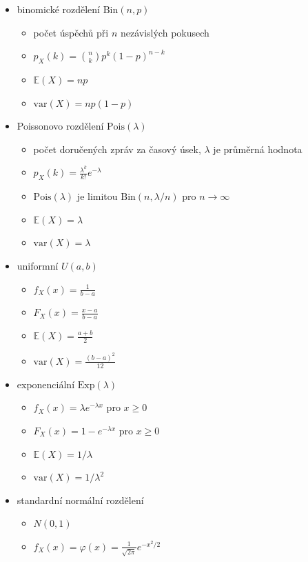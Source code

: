 \begin{itemize}
\begin{itemize}
\begin{itemize}
\item $\text{var}(X)=\frac{1-p}{p^2}$
\end{itemize}
\item binomické rozdělení $\text{Bin}(n,p)$
\begin{itemize}
\item počet úspěchů při $n$ nezávislých pokusech
\item $p_X(k)={n\choose k}p^k(1-p)^{n-k}$
\item $\mathbb E(X)=np$
\item $\text{var}(X)=np(1-p)$
\end{itemize}
\item Poissonovo rozdělení $\text{Pois}(\lambda)$
\begin{itemize}
\item počet doručených zpráv za časový úsek, $\lambda$ je průměrná hodnota
\item $p_X(k)=\frac{\lambda^k}{k!}e^{-\lambda}$
\item $\text{Pois}(\lambda)$ je limitou $\text{Bin}(n,\lambda/n)$ pro $n\to\infty$
\item $\mathbb E(X)=\lambda$
\item $\text{var}(X)=\lambda$
\end{itemize}
\item uniformní $U(a,b)$
\begin{itemize}
\item $f_X(x)=\frac 1{b-a}$
\item $F_X(x)=\frac{x-a}{b-a}$
\item $\mathbb E(X)=\frac{a+b}2$
\item $\text{var}(X)=\frac{(b-a)^2}{12}$
\end{itemize}
\item exponenciální $\text{Exp}(\lambda)$
\begin{itemize}
\item $f_X(x)=\lambda e^{-\lambda x}$ pro $x\geq 0$
\item $F_X(x)=1-e^{-\lambda x}$ pro $x\geq 0$
\item $\mathbb E(X)=1/\lambda$
\item $\text{var}(X)=1/\lambda^2$
\end{itemize}
\item standardní normální rozdělení
\begin{itemize}
\item $N(0,1)$
\item $f_X(x)=\varphi(x)=\frac1{\sqrt{2\pi}} e^{-x^2/2}$
\end{itemize}

\end{itemize}
\end{itemize}
